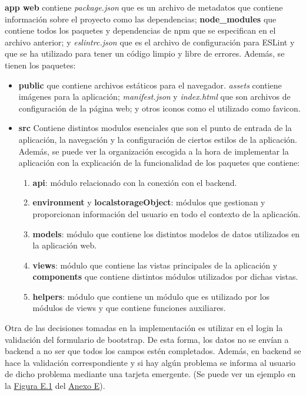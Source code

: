 \textbf{app web} contiene \textit{package.json} que es un archivo de metadatos que contiene información sobre el proyecto como las dependencias; \textbf{node\_modules} que contiene todos los paquetes y dependencias de npm que se especifican en el archivo anterior; y \textit{eslintrc.json} que es el archivo de configuración para ESLint y que se ha utilizado para tener un código limpio y libre de errores. Además, se tienen los paquetes:
\begin{itemize}
	\item \textbf{public} que contiene archivos estáticos para el navegador. \textit{assets} contiene imágenes para la aplicación; \textit{manifest.json} y \textit{index.html} que son archivos de configuración de la página web; y otros iconos como el utilizado como favicon.
	\item \textbf{src} Contiene distintos modulos esenciales que son el punto de entrada de la aplicación, la navegación y la configuración de ciertos estilos de la aplicación. Además, se puede ver la organización escogida a la hora de implementar la aplicación con la explicación de la funcionalidad de los paquetes que contiene:
	\begin{enumerate}
		\item \textbf{api}: módulo relacionado con la conexión con el backend.
		\item \textbf{environment} y \textbf{localstorageObject}: módulos que gestionan y proporcionan información del usuario en todo el contexto de la aplicación.
		\item \textbf{models}: módulo que contiene los distintos modelos de datos utilizados en la aplicación web.
		\item \textbf{views}: módulo que contiene las vistas principales de la aplicación y \textbf{components} que contiene distintos módulos utilizados por dichas vistas.
		\item \textbf{helpers}: módulo que contiene un módulo que es utilizado por los módulos de views y que contiene funciones auxiliares.
	\end{enumerate}
\end{itemize}


Otra de las decisiones tomadas en la implementación es utilizar en el login la validación del formulario de bootstrap. De esta forma, los datos no se envían a backend a no ser que todos los campos estén completados. Además, en backend se hace la validación correspondiente y si hay algún problema se informa al usuario de dicho problema mediante una tarjeta emergente. (Se puede ver un ejemplo en la \hyperref[fig:login-error]{Figura E.1} del \hyperref[anexo-e]{Anexo E}).\\

